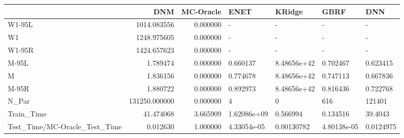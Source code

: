 \begin{tabular}{lrrllll}
\toprule
{} &            DNM &  MC-Oracle &         ENET &       KRidge &         GBRF &        DNN \\
\midrule
W1-95L                        &    1014.083556 &   0.000000 &            - &            - &            - &          - \\
W1                            &    1248.975605 &   0.000000 &            - &            - &            - &          - \\
W1-95R                        &    1424.657623 &   0.000000 &            - &            - &            - &          - \\
M-95L                         &       1.789474 &   0.000000 &     0.660137 &  8.48656e+42 &     0.702467 &   0.623415 \\
M                             &       1.836156 &   0.000000 &     0.774678 &  8.48656e+42 &     0.747113 &   0.667836 \\
M-95R                         &       1.880722 &   0.000000 &     0.892973 &  8.48656e+42 &     0.816436 &   0.722768 \\
N\_Par                         &  131250.000000 &   0.000000 &            4 &            0 &          616 &     121401 \\
Train\_Time                    &      41.474068 &   3.665909 &  1.62086e+09 &     0.566994 &     0.134516 &    39.4043 \\
Test\_Time/MC-Oracle\_Test\_Time &       0.012630 &   1.000000 &  4.33054e-05 &   0.00130782 &  4.80138e-05 &  0.0124975 \\
\bottomrule
\end{tabular}
